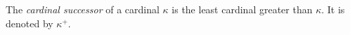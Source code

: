 \documentclass[12pt]{article}
\begin{document}
The {\em cardinal successor} of a cardinal $\kappa$ is the least cardinal greater than $\kappa$. It is denoted by $\kappa^+$.
\end{document}
